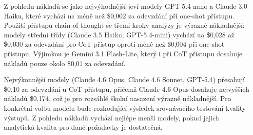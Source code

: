 Z pohledu nákladů se jako nejvýhodnější jeví modely GPT-5.4-nano a Claude 3.0 Haiku, které vychází na méně než \$0,002 za odevzdání při one-shot přístupu.
Použití přístupu chain-of-thought se třemi kroky analýzy je výrazně nákladnější: modely střední třídy (Claude 3.5 Haiku, GPT-5.4-mini) vychází na \$0,028 až \$0,030 za odevzdání pro CoT přístup oproti méně než \$0,004 při one-shot přístupu.
Výjimkou je Gemini 3.1 Flash-Lite, který i při CoT přístupu dosahuje nákladů pouze okolo \$0,01 za odevzdání.

Nejvýkonnější modely (Claude 4.6 Opus, Claude 4.6 Sonnet, GPT-5.4) přesahují \$0,10 za odevzdání u CoT přístupu, přičemž Claude 4.6 Opus dosahuje nejvyšších nákladů \$0,174, což je pro rozsáhlé školní nasazení výrazně nákladnější.
Pro konkrétní volbu modelu bude rozhodující výsledek srovnávacího testování kvality výstupů.
Z pohledu nákladů vychází nejlépe menší modely, pokud jejich analytická kvalita pro dané požadavky je dostatečná.

\endinput